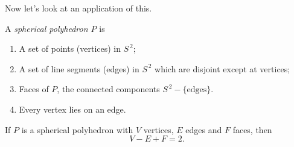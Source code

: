 Now let's look at an application of this.

\begin{definition}
	A \emph{spherical polyhedron $P$} is
	\begin{enumerate}
		\shortskip
		\item A set of points (vertices) in $S^{\,2}$;
		\item A set of line segments (edges) in $S^{\,2}$ which are disjoint except at vertices;
		\item Faces of $P$, the connected components $S^{\,2}-\{\text{edges}\}$.
		\item Every vertex lies on an edge.
	\end{enumerate}
\end{definition}

\begin{theorem}
	 If $P$ is a spherical polyhedron with $V$ vertices, $E$ edges and $F$ faces, then %
	\begin{equation*}
		V-E+F=2.
	\end{equation*}
\end{theorem}

